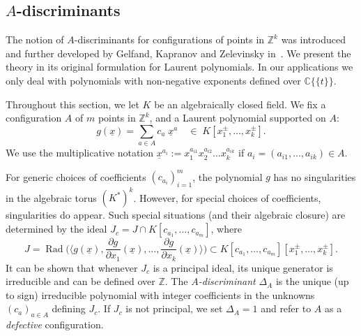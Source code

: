 \documentclass[11pt]{amsart}
\numberwithin{equation}{section}
\theoremstyle{plain}
\theoremstyle{definition}
\theoremstyle{remark}
\begin{document}
\subsection{$A$-discriminants}
\label{sec:discriminants}
The notion of $A$-discriminants for configurations of points in
${\mathbb{Z}}^k$ was introduced and further developed by Gelfand, Kapranov and
Zelevinsky in~\cite{GKZ}. We present the theory in its original
formulation for Laurent polynomials. In our applications we only deal
with polynomials with non-negative exponents defined over
${{\mathbb{C}}\{\!\{t
\}\!\}}$.

Throughout this section, we let $K$ be an algebraically closed
field. We fix a configuration $A$ of $m$ points in ${\mathbb{Z}}^k$, and a
Laurent polynomial supported on $A$:
\[
g(\underline{x})=\sum_{a\in A} c_{a}\;\underline{x}^{a}  \quad \in\; K[x_1^{\pm},\ldots, x_k^{\pm}].
\]
We  use the multiplicative notation $\underline{x}^{a_i}:=
x_1^{a_{i1}}x_2^{a_{i2}}\ldots x_k^{a_{ik}}$ if $a_i=(a_{i1},\ldots, a_{ik})\in A$.

For generic choices of coefficients $(c_{a_i})_{i=1}^m$, the
polynomial $g$ has no singularities in the algebraic torus
$(K^*)^k$. However, for special choices of coefficients, singularities
do appear. Such special situations (and their algebraic closure) are
determined by the ideal $J_c=J\cap K[c_{a_1}, \ldots, c_{a_m}]$, where
\[
J=\operatorname{Rad}\big(\langle g(\underline{x}),\frac{\partial g}{\partial
  {x_1}}(\underline{x}),\ldots, \frac{\partial g}{\partial
  {x_k}}(\underline{x})\rangle\big) \subset K[c_{a_1},\ldots, c_{a_m}][x_1^{\pm},\ldots,x_k^{\pm}].
\]
It can be shown that whenever $J_c$ is a principal ideal, its unique
generator is irreducible and can be defined over ${\mathbb{Z}}$. The
\emph{$A$-discriminant} $\Delta_A$ is the unique (up to sign)
irreducible polynomial with integer coefficients in the unknowns
$(c_a)_{a\in A}$ defining $J_c$. If $J_c$ is not principal, we set $\Delta_A=1$ and
refer to $A$ as a \emph{defective} configuration. 
\end{document}
